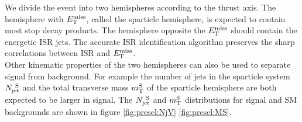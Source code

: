 \indent We divide the event into two hemispheres according to the thrust axis.  The hemisphere with $E_{\mathrm{T}}^{\mathrm{miss}}$, called the sparticle hemisphere, is expected to contain most stop decay products. The hemisphere opposite the $E_{\mathrm{T}}^{\mathrm{miss}}$ should contain the energetic ISR jets.  The accurate ISR identification algorithm preserves the sharp correlations between ISR and $E_{\mathrm{T}}^{\mathrm{miss}}$.  \\

\indent Other kinematic properties of the two hemispheres can also be used to separate signal from background.  For example the number of jets in the sparticle system $N_{\mathrm{jet}}^{~\mathrm{S}}$ and the total transverse mass $m_{\mathrm{T}}^{\mathrm{S}}$ of the sparticle hemisphere are both expected to be larger in signal.  The $N_{\mathrm{jet}}^{~\mathrm{S}}$ and $m_{\mathrm{T}}^{\mathrm{S}}$ distributions for signal and SM backgrounds are shown in figure \ref{fig:presel:NjV} \ref{fig:presel:MS}. \\

